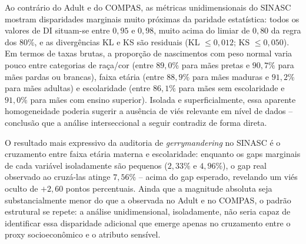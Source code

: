 Ao contrário do Adult e do COMPAS, as métricas unidimensionais do SINASC mostram disparidades marginais muito próximas da paridade estatística: todos os valores de DI situam-se entre $0,95$ e $0,98$, muito acima do limiar de $0,80$ da regra dos 80\%, e as divergências KL e KS são residuais (KL $\leq 0,012$; KS $\leq 0,050$). Em termos de taxas brutas, a proporção de nascimentos com peso normal varia pouco entre categorias de raça/cor (entre $89,0\%$ para mães pretas e $90,7\%$ para mães pardas ou brancas), faixa etária (entre $88,9\%$ para mães maduras e $91,2\%$ para mães adultas) e escolaridade (entre $86,1\%$ para mães sem escolaridade e $91,0\%$ para mães com ensino superior). Isolada e superficialmente, essa aparente homogeneidade poderia sugerir a ausência de viés relevante em nível de dados -- conclusão que a análise interseccional a seguir contradiz de forma direta.

\begin{table}[H]
    \centering
    \caption{Resultados da auditoria de viés interseccional oculto em pares de atributos sensíveis/proxies (SINASC).}
    \vspace{2mm}
    \label{tab:sinasc_gerrymandering_audit}
\end{table}

O resultado mais expressivo da auditoria de \textit{gerrymandering} no SINASC é o cruzamento entre faixa etária materna e escolaridade: enquanto os gaps marginais de cada variável isoladamente são pequenos ($2,33\%$ e $4,96\%$), o gap real observado ao cruzá-las atinge $7,56\%$ -- acima do gap esperado, revelando um viés oculto de $+2,60$ pontos percentuais. Ainda que a magnitude absoluta seja substancialmente menor do que a observada no Adult e no COMPAS, o padrão estrutural se repete: a análise unidimensional, isoladamente, não seria capaz de identificar essa disparidade adicional que emerge apenas no cruzamento entre o proxy socioeconômico e o atributo sensível.

